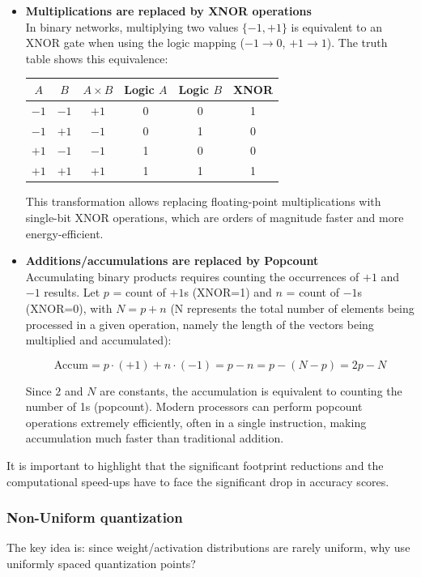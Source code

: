 \begin{itemize}
    \item \textbf{Multiplications are replaced by XNOR operations}\\
    In binary networks, multiplying two values $\{-1, +1\}$ is equivalent to an XNOR gate when using the logic mapping ($-1 \rightarrow 0$, $+1 \rightarrow 1$). The truth table shows this equivalence:
    
    \begin{center}
    \begin{tabular}{ccc|cc|c}
    $A$ & $B$ & $A \times B$ & Logic $A$ & Logic $B$ & XNOR \\
    \hline
    $-1$ & $-1$ & $+1$ & 0 & 0 & 1 \\
    $-1$ & $+1$ & $-1$ & 0 & 1 & 0 \\
    $+1$ & $-1$ & $-1$ & 1 & 0 & 0 \\
    $+1$ & $+1$ & $+1$ & 1 & 1 & 1 \\
    \end{tabular}
    \end{center}
    
    This transformation allows replacing floating-point multiplications with single-bit XNOR operations, which are orders of magnitude faster and more energy-efficient.
    
    \item \textbf{Additions/accumulations are replaced by Popcount}\\
    Accumulating binary products requires counting the occurrences of $+1$ and $-1$ results. Let $p$ = count of $+1$s (XNOR=1) and $n$ = count of $-1$s (XNOR=0), with $N = p + n$ (N represents the total number of elements being processed in a given operation, namely the length of the vectors being multiplied and accumulated):
    
    $$\text{Accum} = p \cdot (+1) + n \cdot (-1) = p - n = p - (N - p) = 2p - N$$
    
    Since $2$ and $N$ are constants, the accumulation is equivalent to counting the number of 1s (popcount). Modern processors can perform popcount operations extremely efficiently, often in a single instruction, making accumulation much faster than traditional addition.
\end{itemize}

It is important to highlight that the significant footprint reductions and the computational speed-ups have to face the significant drop in accuracy scores.

\subsubsection{Non-Uniform quantization}
The key idea is: since weight/activation distributions are rarely uniform, why use uniformly spaced quantization points?

